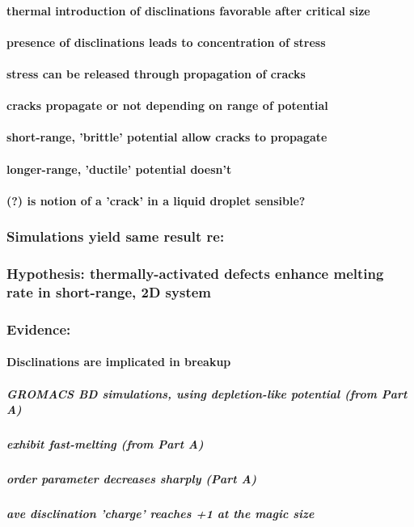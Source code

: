 \documentclass{article}
\begin{document}
\paragraph{thermal introduction of disclinations favorable after critical size}
\label{sec-2.1.3.1}
\paragraph{presence of disclinations leads to concentration of stress}
\label{sec-2.1.3.2}
\paragraph{stress can be released through propagation of cracks}
\label{sec-2.1.3.3}
\paragraph{cracks propagate or not depending on range of potential}
\label{sec-2.1.3.4}
\paragraph{short-range, 'brittle' potential allow cracks to propagate}
\label{sec-2.1.3.5}
\paragraph{longer-range, 'ductile' potential doesn't}
\label{sec-2.1.3.6}
\paragraph{(?) is notion of a 'crack' in a liquid droplet sensible?}
\label{sec-2.1.3.7}
\subsubsection{Simulations yield same result re:}
\label{sec-2.1.4}
\subsubsection{Hypothesis: thermally-activated defects enhance melting rate in short-range, 2D system}
\label{sec-2.1.5}
\subsubsection{Evidence:}
\label{sec-2.1.6}
\paragraph{Disclinations are implicated in breakup}
\label{sec-2.1.6.1}
\subparagraph{GROMACS BD simulations, using depletion-like potential (from Part A)}
\label{sec-2.1.6.1.1}
\subparagraph{exhibit fast-melting (from Part A)}
\label{sec-2.1.6.1.2}
\subparagraph{order parameter decreases sharply (Part A)}
\label{sec-2.1.6.1.3}
\subparagraph{ave disclination 'charge' reaches +1 at the magic size}
\label{sec-2.1.6.1.4}
\end{document}
